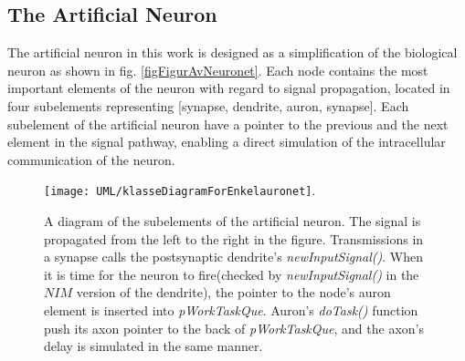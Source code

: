 			

 		\subsection{The Artificial Neuron} %
			The artificial neuron in this work is designed as a simplification of the biological neuron as shown in fig. \ref{figFigurAvNeuronet}.
			Each node contains the most important elements of the neuron with regard to signal propagation, %
				located in four subelements representing [synapse, dendrite, auron, synapse].
			Each subelement of the artificial neuron have a pointer to the previous and the next element in the signal pathway, enabling a direct simulation of the intracellular communication of the neuron.
			
\begin{figure}[hbt!p]
	\centering
	\texttt{[image: UML/klasseDiagramForEnkelauronet]}.
	\caption[A sketch of the subelement design of a node in the ANN, enabling the intracellular communication scheme used for signal propagation in the artificial neuron]
				{A diagram of the subelements of the artificial neuron.
				The signal is propagated from the left to the right in the figure.
				Transmissions in a synapse calls the postsynaptic dendrite's \emph{newInputSignal()}.
				When it is time for the neuron to fire(checked by \emph{newInputSignal()} in the $NIM$ version of the dendrite), the pointer to the node's auron element is inserted into \emph{pWorkTaskQue}.
				Auron's \emph{doTask()} function push its axon pointer to the back of \emph{pWorkTaskQue}, and the axon's delay is simulated in the same manner.
				}
	\label{figUMLClassDiagramForASingleNeuron}
\end{figure}

